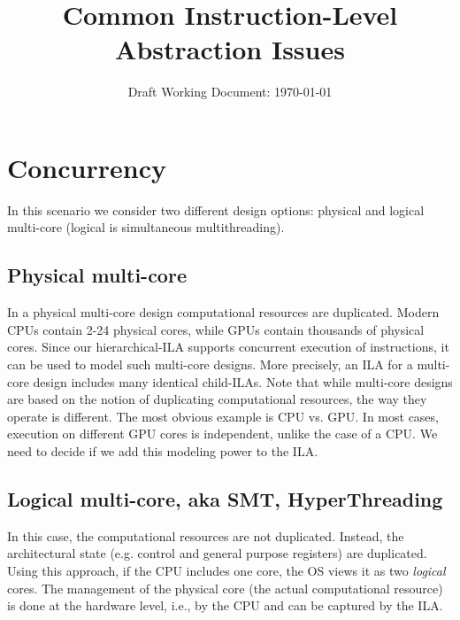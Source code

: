 \documentclass[letterpaper, 11 pt]{article}  %
\title{Common Instruction-Level Abstraction Issues}
\author{}
\date{Draft Working Document: \today}
\begin{document}
\maketitle

\providecommand{\bd}[0]{\mathbb{B}}
\providecommand{\st}[1]{\mathrm{#1}}
\providecommand{\ft}[1]{\mathtt{#1}}










\section*{Concurrency}

In this scenario we consider two different design options: physical and logical multi-core (logical is simultaneous multithreading). 
\subsection*{Physical multi-core} 
In a physical multi-core design computational resources are duplicated. Modern CPUs contain 2-24 physical cores, while GPUs contain thousands of physical cores. Since our hierarchical-ILA supports concurrent execution of instructions, it can be used to model such multi-core designs. More precisely, an ILA for a multi-core design includes many identical child-ILAs. Note that while multi-core designs are based on the notion of duplicating computational resources, the way they operate is different. The most obvious example is CPU vs. GPU. In most cases, execution on different GPU cores is independent, unlike the case of a CPU. We need to decide if we add this modeling power to the ILA.

\subsection*{Logical multi-core, aka SMT, HyperThreading}
In this case, the computational resources are not duplicated. Instead, the architectural state (e.g. control and general purpose registers) are duplicated. Using this approach, if the CPU includes one core, the OS views it as two \emph{logical} cores. The management of the physical core (the actual computational resource) is done at the hardware level, i.e., by the CPU and can be captured by the ILA.

%
%
\end{document}
